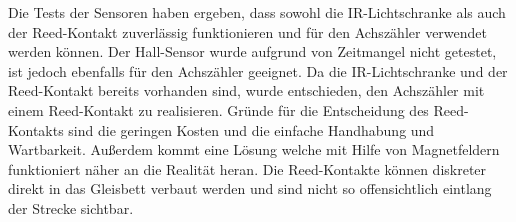Die Tests der Sensoren haben ergeben, dass sowohl die IR-Lichtschranke als auch der Reed-Kontakt zuverlässig funktionieren und für den Achszähler verwendet werden können. Der Hall-Sensor wurde aufgrund von Zeitmangel nicht getestet, ist jedoch ebenfalls für den Achszähler geeignet. Da die IR-Lichtschranke und der Reed-Kontakt bereits vorhanden sind, wurde entschieden, den Achszähler mit einem Reed-Kontakt zu realisieren.
\newline
Gründe für die Entscheidung des Reed-Kontakts sind die geringen Kosten und die einfache Handhabung und Wartbarkeit. Außerdem kommt eine Lösung welche mit Hilfe von Magnetfeldern funktioniert näher an die Realität heran. Die Reed-Kontakte können diskreter direkt in das Gleisbett verbaut werden und sind nicht so offensichtlich eintlang der Strecke sichtbar.
